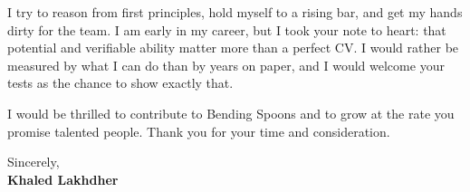 \documentclass[11pt,a4paper]{article}
\begin{document}
I try to reason from first principles, hold myself to a rising bar, and get my hands dirty for the team. I am early in my career, but I took your note to heart: that potential and verifiable ability matter more than a perfect CV. I would rather be measured by what I can do than by years on paper, and I would welcome your tests as the chance to show exactly that.

I would be thrilled to contribute to Bending Spoons and to grow at the rate you promise talented people. Thank you for your time and consideration.

\vspace{6pt}
Sincerely,\\[10pt]
\textbf{Khaled Lakhdher}
\end{document}

